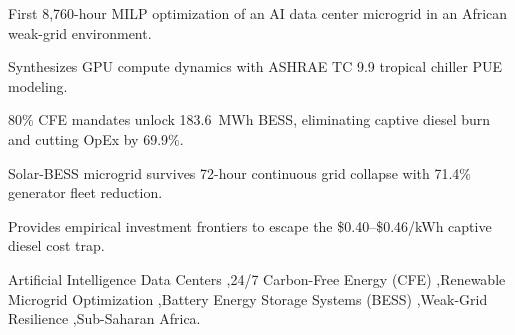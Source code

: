 \documentclass[12pt,3p,review]{elsarticle}
\begin{document}
\begin{frontmatter}
\begin{abstract}
Results reveal that under unconstrained economic dispatch (S1), the optimal system deploys 41.4~MW of Solar PV and 17.5~MW of modular diesel engines, achieving 38.0\% carbon abatement and an 8-year payback without battery storage, as nighttime grid imports remain cheaper than storage capital amortization. However, enforcing an 80\% CFE mandate (S2) unlocks a 183.6~MWh Battery Energy Storage System (BESS) and 95.9~MW of solar, completely eliminating operational diesel burn, slashing facility carbon emissions by 76.7\%, and delivering an LCOE of \$0.1693/kWh—representing a 58\% to 63\% cost reduction against the \$0.40--\$0.46/kWh captive diesel baseline while saving \$14.94M annually in operating costs (payback within 13 years). Moving to near-complete decarbonization (S3: 95\% CFE) exposes a steep ``green premium,'' requiring 253.1~MWh of BESS and 113.8~MW of solar to eliminate 89.8\% of emissions. Crucially, under a 72-hour total grid collapse (S4), the solar-storage microgrid guarantees 100\% critical load survivability (Loss of Load Probability = 0\%) while slashing the backup fossil generator fleet by 71.4\% (from 17.5~MW to 5.0~MW). These empirical findings provide the first actionable engineering and investment roadmap for powering gigawatt-era artificial intelligence across weak grids in the Global South.
\end{abstract}

\begin{highlights}
\item First 8,760-hour MILP optimization of an AI data center microgrid in an African weak-grid environment.
\item Synthesizes GPU compute dynamics with ASHRAE TC 9.9 tropical chiller PUE modeling.
\item 80\% CFE mandates unlock 183.6~MWh BESS, eliminating captive diesel burn and cutting OpEx by 69.9\%.
\item Solar-BESS microgrid survives 72-hour continuous grid collapse with 71.4\% generator fleet reduction.
\item Provides empirical investment frontiers to escape the \$0.40--\$0.46/kWh captive diesel cost trap.
\end{highlights}

\begin{keyword}
Artificial Intelligence Data Centers \sep 24/7 Carbon-Free Energy (CFE) \sep Renewable Microgrid Optimization \sep Battery Energy Storage Systems (BESS) \sep Weak-Grid Resilience \sep Sub-Saharan Africa.
\end{keyword}

\end{frontmatter}
\end{document}
